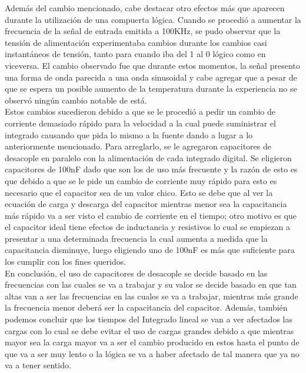\documentclass{report}
\begin{document}
Además del cambio mencionado, cabe destacar otro efectos más que aparecen durante la utilización de una compuerta lógica. Cuando se procedió a aumentar la frecuencia de la señal de entrada emitida a 100KHz, se pudo observar que la tensión de alimentación experimentaba cambios durante los cambios casi instantáneos de tensión, tanto para cuando iba del 1 al 0 lógico como en viceversa. El cambio observado fue que durante estos momentos, la señal presento una forma de onda parecida a una onda sinusoidal y cabe agregar que a pesar de que se espera un posible aumento de la temperatura durante la experiencia no se observó ningún cambio notable de está.\\
Estos cambios sucedieron debido a que se le procedió a pedir un cambio de corriente demasiado rápido para la velocidad a la cual puede suministrar el integrado causando que pida lo mismo a la fuente dando a lugar a lo anteriormente mencionado. Para arreglarlo, se le agregaron capacitores de desacople en paralelo con la alimentación de cada integrado digital. Se eligieron capacitores de 100nF dado que son los de uso más frecuente y la razón de esto es que debido a que se le pide un cambio de corriente muy rápido para esto es necesario que el capacitor sea de un valor chico. Esto se debe que al ver la ecuación de carga y descarga del capacitor mientras menor sea la capacitancia más rápido va a ser visto el cambio de corriente en el tiempo; otro motivo es que el capacitor ideal tiene efectos de inductancia y resistivos lo cual se empiezan a presentar a una determinada frecuencia la cual aumenta a medida que la capacitancia disminuye, luego eligiendo uno de 100nF es más que suficiente para los cumplir con los fines queridos.\\
En conclusión, el uso de capacitores de desacople se decide basado en las frecuencias con las cuales se va a trabajar y su valor se decide basado en que tan altas van a ser las frecuencias en las cuales se va a trabajar, mientras más grande la frecuencia menor deberá ser la capacitancia del capacitor. Además, también podemos concluir que los tiempos del Integrado lineal se van a ver afectados las cargas con lo cual se debe evitar el uso de cargas grandes debido a que mientras mayor sea la carga mayor va a ser el cambio producido en estos hasta el punto de que va a ser muy lento o la lógica se va a haber afectado de tal manera que ya no va a tener sentido.\\
\end{document}
